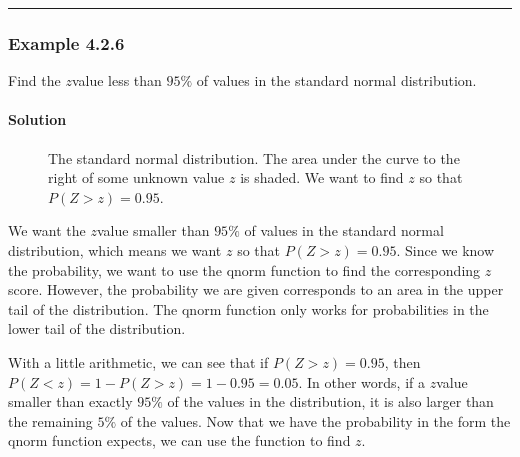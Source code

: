 \documentclass[letterpaper,10pt,english]{jupyterBook}
\begin{document}
\bigskip\hrule\bigskip



\subsubsection{Example 4.2.6}
\label{\detokenize{Ch4 The Normal Distribution and the Central Limit Theorem/4.2 The Standard Normal Distribution:example-4-2-6}}
\sphinxAtStartPar
Find the \(z\)\sphinxhyphen{}value less than \(95\%\) of values in the standard normal distribution.


\paragraph{Solution}
\label{\detokenize{Ch4 The Normal Distribution and the Central Limit Theorem/4.2 The Standard Normal Distribution:id9}}
\begin{figure}[htbp]
\centering
\capstart

\noindent{}
\caption{The standard normal distribution. The area under the curve to the right of some unknown value \(z\) is shaded. We want to find \(z\) so that \(P(Z > z) = 0.95\).}\label{\detokenize{Ch4 The Normal Distribution and the Central Limit Theorem/4.2 The Standard Normal Distribution:stdnormal-ex7}}\end{figure}

\sphinxAtStartPar
We want the \(z\)\sphinxhyphen{}value smaller than \(95\%\) of values in the standard normal distribution, which means we want \(z\) so that \(P(Z > z) = 0.95\). Since we know the probability, we want to use the qnorm function to find the corresponding \(z\)\sphinxhyphen{}score. However, the probability we are given corresponds to an area in the upper tail of the distribution. The qnorm function only works for probabilities in the lower tail of the distribution.

\sphinxAtStartPar
With a little arithmetic, we can see that if \(P(Z > z) = 0.95\), then \(P(Z < z) = 1 - P(Z > z) = 1 - 0.95 = 0.05\). In other words, if a \(z\)\sphinxhyphen{}value smaller than exactly \(95\%\) of the values in the distribution, it is also larger than the remaining \(5\%\) of the values. Now that we have the probability in the form the qnorm function expects, we can use the function to find \(z\).
\end{document}
